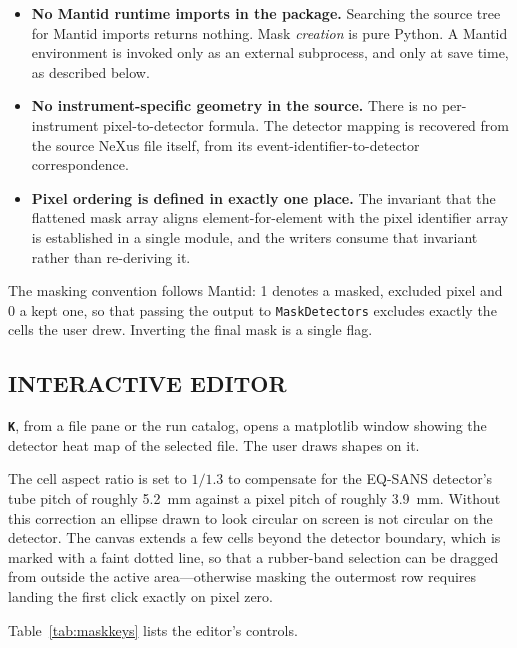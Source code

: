 \documentclass[tm]{ornltm}
\newcommand{\key}[1]{\textbf{\texttt{#1}}}
\begin{document}
\begin{itemize}
  \item \textbf{No Mantid runtime imports in the package.} Searching the source
    tree for Mantid imports returns nothing. Mask \emph{creation} is pure Python.
    A Mantid environment is invoked only as an external subprocess, and only at
    save time, as described below.
  \item \textbf{No instrument-specific geometry in the source.} There is no
    per-instrument pixel-to-detector formula. The detector mapping is recovered
    from the source NeXus file itself, from its event-identifier-to-detector
    correspondence.
  \item \textbf{Pixel ordering is defined in exactly one place.} The invariant
    that the flattened mask array aligns element-for-element with the pixel
    identifier array is established in a single module, and the writers consume
    that invariant rather than re-deriving it.
\end{itemize}

The masking convention follows Mantid: 1 denotes a masked, excluded pixel and 0 a
kept one, so that passing the output to \texttt{MaskDetectors} excludes exactly
the cells the user drew. Inverting the final mask is a single flag.

\subsection{INTERACTIVE EDITOR}

\key{K}, from a file pane or the run catalog, opens a matplotlib window showing
the detector heat map of the selected file. The user draws shapes on it.

The cell aspect ratio is set to $1/1.3$ to compensate for the EQ-SANS detector's
tube pitch of roughly 5.2~mm against a pixel pitch of roughly 3.9~mm. Without
this correction an ellipse drawn to look circular on screen is not circular on
the detector. The canvas extends a few cells beyond the detector boundary, which
is marked with a faint dotted line, so that a rubber-band selection can be
dragged from outside the active area---otherwise masking the outermost row
requires landing the first click exactly on pixel zero.

Table~\ref{tab:maskkeys} lists the editor's controls.
\end{document}
